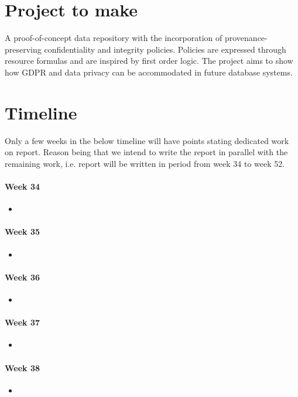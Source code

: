 \section{Project to make}
A proof-of-concept data repository with the incorporation of provenance-preserving confidentiality and integrity policies. Policies are expressed through resource formulas and are inspired by first order logic. The project aims to show how GDPR and data privacy can be accommodated in future database systems.

\section{Timeline}
Only a few weeks in the below timeline will have points stating dedicated work on report. Reason being that we intend to write the report in parallel with the remaining work, i.e. report will be written in period from week 34 to week 52.

\paragraph{Week 34}
\begin{itemize}
    \item 
\end{itemize}
\paragraph{Week 35}
\begin{itemize}
    \item 
\end{itemize}
\paragraph{Week 36}
\begin{itemize}
    \item 
\end{itemize}
\paragraph{Week 37}
\begin{itemize}
    \item 
\end{itemize}
\paragraph{Week 38}
\begin{itemize}
    \item 
\end{itemize}
